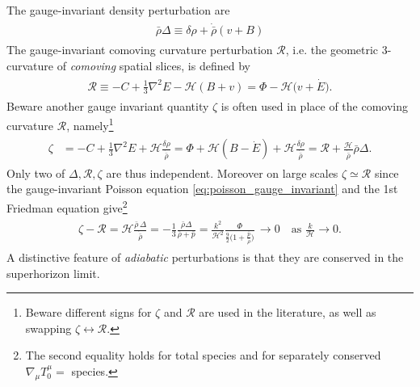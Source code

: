 The gauge-invariant density perturbation are
\begin{align}
\begin{aligned}
    \bar{\rho} \Delta \equiv \delta \rho+\dot{\bar{\rho}}(v+B)
\end{aligned}
\end{align}
The gauge-invariant comoving curvature perturbation $\mathcal{R}$, i.e. the geometric 3-curvature of \emph{comoving} spatial slices, is defined by
\begin{align}\label{eq:comoving_curvature_perturbations_gauge_inv_and_newtonian}
\begin{aligned}
    \mathcal{R}\equiv -C+\tfrac13\nabla^2E-\mathcal{H}(B+v) = \Phi -\mathcal{H}\big(v+\dot{E}\big).
\end{aligned}
\end{align}
Beware another gauge invariant quantity $\zeta$ is often used in place of the comoving curvature $\mathcal{R}$, namely\footnote{Beware different signs for $\zeta$ and $\mathcal{R}$ are used in the literature, as well as swapping $\zeta\leftrightarrow\mathcal{R}$.}
{\small\begin{align}
\begin{aligned}
    \zeta & =-C+\frac{1}{3} \nabla^{2} E+\mathcal{H} \frac{\delta \rho}{\dot{\bar{\rho}}} = \Phi +\mathcal{H}(B-\dot{E})+ \mathcal{H}\frac{\delta \rho}{\dot{\bar{\rho}}} = \mathcal{R}+\frac{\mathcal{H}}{\dot{\bar{\rho}}} \bar{\rho} \Delta.
\end{aligned}
\end{align}}
Only two of $\Delta, \mathcal{R}, \zeta$ are thus independent.
Moreover on large scales $\zeta \simeq \mathcal{R}$ since the gauge-invariant Poisson equation \eqref{eq:poisson_gauge_invariant} and the 1st Friedman equation give\footnote{The second equality holds for total species and for separately conserved $\nabla_\mu T^\mu_0=$ species.}
{\small
\begin{align}
\begin{aligned}
    \zeta-\mathcal{R}=\mathcal{H}\frac{\bar{\rho}\, \Delta }{\dot{\bar{\rho}}}
    = -\tfrac13 \frac{\bar{\rho}\Delta}{\bar{\rho}+\bar{p}}
    =\frac{k^2}{\mathcal{H}^2}\frac{\Phi}{\tfrac92 \Big(1+\frac{\bar{p}}{\bar{\rho}}\Big)}
    \,\to 0\quad\text{as}\,\,\frac{k}{\mathcal{H}}\to0.
\end{aligned}
\end{align}}
A distinctive feature of \emph{adiabatic} perturbations is that they are conserved in the superhorizon limit.




